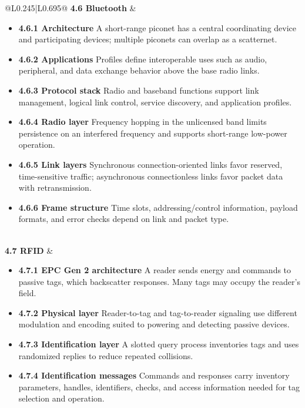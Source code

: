 \documentclass[10pt,letterpaper]{article}
\begin{document}
\begin{longtable}{@{}L{0.245\textwidth}|L{0.695\textwidth}@{}}
\textbf{4.6 Bluetooth} & \begin{minipage}[t]{\linewidth}\raggedright \begin{itemize}\item \textbf{4.6.1 Architecture} A short-range piconet has a central coordinating device and participating devices; multiple piconets can overlap as a scatternet.\item \textbf{4.6.2 Applications} Profiles define interoperable uses such as audio, peripheral, and data exchange behavior above the base radio links.\item \textbf{4.6.3 Protocol stack} Radio and baseband functions support link management, logical link control, service discovery, and application profiles.\item \textbf{4.6.4 Radio layer} Frequency hopping in the unlicensed band limits persistence on an interfered frequency and supports short-range low-power operation.\item \textbf{4.6.5 Link layers} Synchronous connection-oriented links favor reserved, time-sensitive traffic; asynchronous connectionless links favor packet data with retransmission.\item \textbf{4.6.6 Frame structure} Time slots, addressing/control information, payload formats, and error checks depend on link and packet type.\end{itemize}\end{minipage} \\ \hline
{}\textbf{4.7 RFID} & \begin{minipage}[t]{\linewidth}\raggedright \begin{itemize}\item \textbf{4.7.1 EPC Gen 2 architecture} A reader sends energy and commands to passive tags, which backscatter responses. Many tags may occupy the reader's field.\item \textbf{4.7.2 Physical layer} Reader-to-tag and tag-to-reader signaling use different modulation and encoding suited to powering and detecting passive devices.\item \textbf{4.7.3 Identification layer} A slotted query process inventories tags and uses randomized replies to reduce repeated collisions.\item \textbf{4.7.4 Identification messages} Commands and responses carry inventory parameters, handles, identifiers, checks, and access information needed for tag selection and operation.\end{itemize}\end{minipage} \\ \hline

\end{longtable}
\end{document}
